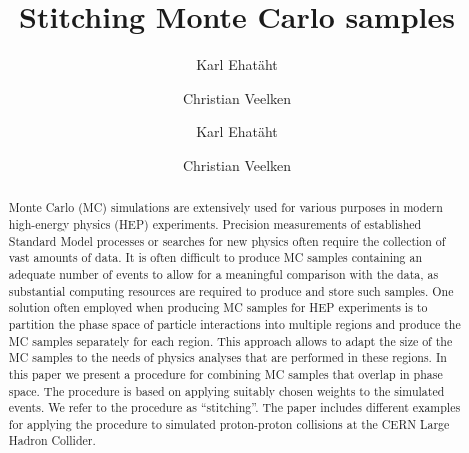 \documentclass[a4paper,english,11pt]{article}
\begin{document}
\ifx\ver\verPAPER
\begin{frontmatter}
\fi

\title{Stitching Monte Carlo samples}


\ifx\ver\verPreprint
\author[1]{Karl Ehat\"aht}
\author[1]{Christian Veelken}
\fi
\ifx\ver\verPAPER
\author[tallinn]{Karl Ehat\"aht}
\author[tallinn]{Christian Veelken}
\address[tallinn]{National Institute for Chemical Physics and Biophysics, 10143 Tallinn, Estonia}
\fi

\ifx\ver\verPreprint
\maketitle
\fi

\begin{abstract}
Monte Carlo (MC) simulations are extensively used for various purposes in modern high-energy physics (HEP) experiments.
Precision measurements of established Standard Model processes or searches for new physics often require the collection of vast amounts of data.
It is often difficult to produce MC samples containing an adequate number of events to allow for a meaningful comparison with the data, 
as substantial computing resources are required to produce and store such samples.
One solution often employed when producing MC samples for HEP experiments 
is to partition the phase space of particle interactions into multiple regions 
and produce the MC samples separately for each region.
This approach allows to adapt the size of the MC samples to the needs of physics analyses that are performed in these regions.
In this paper we present a procedure for combining MC samples that overlap in phase space.
The procedure is based on applying suitably chosen weights to the simulated events.
We refer to the procedure as ``stitching''.
The paper includes different examples for applying the procedure to simulated proton-proton collisions at the CERN Large Hadron Collider.
\end{abstract}

\ifx\ver\verPAPER
\end{frontmatter}
\fi

\clearpage










\appendix


\clearpage


\end{document}
